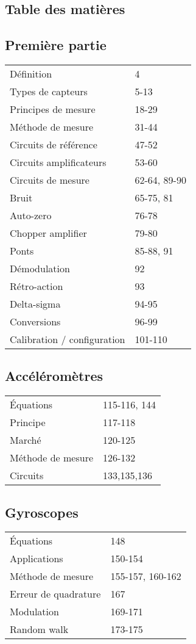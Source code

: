 \documentclass[]{article}
\begin{document}
\begin{multicols}{2}
\section{Table des matières}
\subsection{Première partie}
\begin{tabular}{ll}
Définition & 4\\
Types de capteurs & 5-13\\
Principes de mesure & 18-29\\
Méthode de mesure & 31-44\\
Circuits de référence & 47-52\\
Circuits amplificateurs & 53-60\\
Circuits de mesure & 62-64, 89-90\\
Bruit & 65-75, 81\\
Auto-zero & 76-78\\
Chopper amplifier & 79-80\\
Ponts & 85-88, 91\\
Démodulation & 92\\
Rétro-action & 93\\
Delta-sigma & 94-95\\
Conversions & 96-99\\
Calibration / configuration & 101-110\\
\end{tabular}
\subsection{Accéléromètres}
\begin{tabular}{ll}
Équations & 115-116, 144\\
Principe & 117-118\\
Marché & 120-125\\
Méthode de mesure & 126-132\\
Circuits & 133,135,136\\
\end{tabular}
\subsection{Gyroscopes}
\begin{tabular}{ll}
Équations & 148\\
Applications & 150-154\\
Méthode de mesure & 155-157, 160-162\\
Erreur de quadrature & 167\\
Modulation & 169-171\\
Random walk & 173-175\\
\end{tabular}

\end{multicols}
\end{document}
